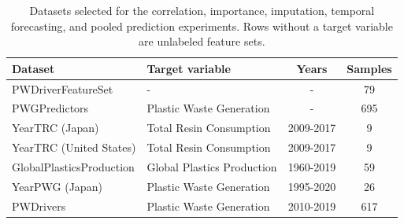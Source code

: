 \begin{table}[!ht]
	\caption{
		\centering
		Datasets selected for the correlation, importance, imputation, temporal forecasting, and pooled prediction experiments. Rows without a target variable are unlabeled feature sets.
	}
	\begin{tabular}{p{4cm} p{5cm} c c}
		\toprule
		\textbf{Dataset}         & \textbf{Target variable}   & \textbf{Years} & \textbf{Samples} \\
		\midrule
		PWDriverFeatureSet       & -                          & -              & 79               \\
		PWGPredictors            & Plastic Waste Generation   & -              & 695              \\
		YearTRC (Japan)          & Total Resin Consumption    & 2009-2017      & 9                \\
		YearTRC (United States)  & Total Resin Consumption    & 2009-2017      & 9                \\
		GlobalPlasticsProduction & Global Plastics Production & 1960-2019      & 59               \\
		YearPWG (Japan)          & Plastic Waste Generation   & 1995-2020      & 26               \\
		PWDrivers                & Plastic Waste Generation   & 2010-2019      & 617              \\
		\bottomrule
	\end{tabular}
	\label{tab:datasets}
\end{table}
